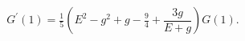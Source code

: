 \begin{equation}
G^\prime (1) = \tfrac{1}{5}\left(E^2 - g^2 + g -
\tfrac{9}{4} +\frac{3 g}{E+g}\right) G(1).
\end{equation}

